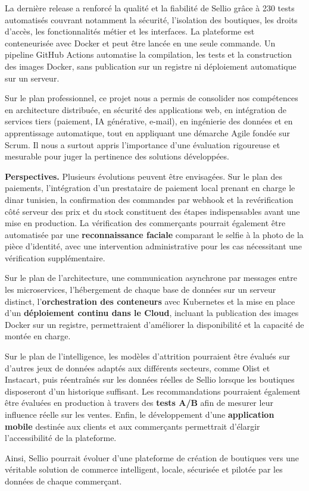 La dernière release a renforcé la qualité et la fiabilité de Sellio grâce à 230 tests automatisés couvrant notamment la sécurité, l'isolation des boutiques, les droits d'accès, les fonctionnalités métier et les interfaces. La plateforme est conteneurisée avec Docker et peut être lancée en une seule commande. Un pipeline GitHub Actions automatise la compilation, les tests et la construction des images Docker, sans publication sur un registre ni déploiement automatique sur un serveur. \newline

Sur le plan professionnel, ce projet nous a permis de consolider nos compétences en architecture distribuée, en sécurité des applications web, en intégration de services tiers (paiement, IA générative, e-mail), en ingénierie des données et en apprentissage automatique, tout en appliquant une démarche Agile fondée sur Scrum. Il nous a surtout appris l'importance d'une évaluation rigoureuse et mesurable pour juger la pertinence des solutions développées. \newline

\textbf{Perspectives.} Plusieurs évolutions peuvent être envisagées. Sur le plan des paiements, l'intégration d'un prestataire de paiement local prenant en charge le dinar tunisien, la confirmation des commandes par webhook et la revérification côté serveur des prix et du stock constituent des étapes indispensables avant une mise en production. La vérification des commerçants pourrait également être automatisée par une \textbf{reconnaissance faciale} comparant le selfie à la photo de la pièce d'identité, avec une intervention administrative pour les cas nécessitant une vérification supplémentaire. \newline

Sur le plan de l'architecture, une communication asynchrone par messages entre les microservices, l'hébergement de chaque base de données sur un serveur distinct, l'\textbf{orchestration des conteneurs} avec Kubernetes et la mise en place d'un \textbf{déploiement continu dans le Cloud}, incluant la publication des images Docker sur un registre, permettraient d'améliorer la disponibilité et la capacité de montée en charge. \newline

Sur le plan de l'intelligence, les modèles d'attrition pourraient être évalués sur d'autres jeux de données adaptés aux différents secteurs, comme Olist et Instacart, puis réentraînés sur les données réelles de Sellio lorsque les boutiques disposeront d'un historique suffisant. Les recommandations pourraient également être évaluées en production à travers des \textbf{tests A/B} afin de mesurer leur influence réelle sur les ventes. Enfin, le développement d'une \textbf{application mobile} destinée aux clients et aux commerçants permettrait d'élargir l'accessibilité de la plateforme. \newline

Ainsi, Sellio pourrait évoluer d'une plateforme de création de boutiques vers une véritable solution de commerce intelligent, locale, sécurisée et pilotée par les données de chaque commerçant.
